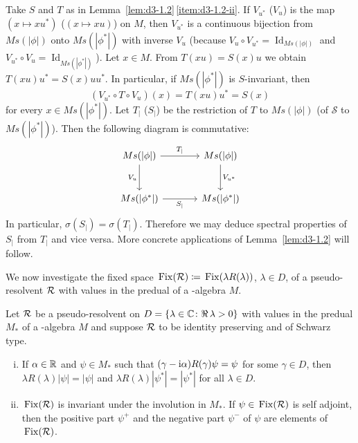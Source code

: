 \begin{remark}\label{rem:d3-1.3}
Take $S$ and $T$ as in Lemma~\ref{lem:d3-1.2}\,\ref{item:d3-1.2-ii}.
If $V_{u^{*}}$ (\resp  $V_u$) is the map $(x \mapsto xu^{*})$ (\resp  $(x \mapsto xu)$) on $M$, then $V_{u^{*}}$ is a continuous bijection from $Ms(|\phi|)$ onto $Ms(|\phi^{*}|)$ with inverse $V_u$ (because $V_u \circ V_{u^{*}} = \operatorname{Id}_{Ms(|\phi|)}$ and $V_{u^{*}} \circ V_u = \operatorname{Id}_{Ms(|\phi^{*}|)}$).
Let $x \in M$.
From $T(xu) = S(x)u$ we obtain $T(xu)u^{*} = S(x)uu^{*}$.
In particular, if $ M s(|\phi^{*}|) $ is $S$-invariant, then
\begin{equation*}
	(V_{u^{*}} \circ T \circ V_u)(x) = T(xu)u^{*} = S(x)
\end{equation*}
for every $x \in Ms(|\phi^{*}|)$.
Let $T_{|}$ (\resp  $S_{|}$) be the restriction of $T$ to $Ms(|\phi|)$ (\resp of $\mathcal{S}$ to $Ms(|\phi^{*}|)$).
Then the following diagram is commutative:
\begin{equation*}
\begin{tikzcd}[column sep=large, row sep=large, scale=1.5]
Ms(|\phi|) \arrow[r, "T_{|}"] \arrow[d, "V_u"'] & Ms(|\phi|) \arrow[d, "V_{u^{*}}"] \\
Ms(|\phi^{*}|) \arrow[r, "S_{|}"'] & Ms(|\phi^{*}|)
\end{tikzcd}
\end{equation*}
In particular, $\sigma(S_{|}) = \sigma(T_{|})$.
Therefore we may deduce spectral properties of $S_{|}$ from $T_{|}$ and vice versa.
More concrete applications of Lemma~\ref{lem:d3-1.2} will follow.
\end{remark}
We now investigate the fixed space $\mathop{}\mathrm{Fix}(\mathcal{R}) \coloneqq \mathop{}\mathrm{Fix}(\lambda R(\lambda))$, $\lambda \in D$, of a pseudo-resolvent $\mathcal{R}$ with values in the predual of a \WA-algebra $M$.
\begin{proposition}\label{prop:d3-1.4}
Let $\mathcal{R}$ be a pseudo-resolvent on $D = \{\lambda \in \mathbb{C} \colon \Re\,\lambda > 0\}$ with values in the predual $M_{*}$ of a \WA-algebra $M$ and suppose $\mathcal{R}$ to be identity preserving and of Schwarz type.
\begin{enumerate}[(i)]

\item\label{item:d3-1.4-i}
If $\alpha \in \mathbb{R}$ and $\psi \in M_{*}$ such that $(\gamma - \mathrm{i}\alpha)R(\gamma)\psi = \psi$ for some $\gamma \in D$, then $\lambda R(\lambda)|\psi| = |\psi|$ and $\lambda R(\lambda)|\psi^{*}| = |\psi^{*}|$ for all $\lambda \in D$.

\item\label{item:d3-1.4-ii} 
$ \mathop{}\mathrm{Fix}(\mathcal{R}) $ is invariant under the involution in $M_{*}$.
If $\psi \in \mathop{}\mathrm{Fix}(\mathcal{R}) $ is self adjoint, then the positive part $\psi^{+}$ and the negative part $\psi^{-}$ of $\psi$ are elements of $ \mathop{}\mathrm{Fix}(\mathcal{R}) $.
\end{enumerate}
\end{proposition}
